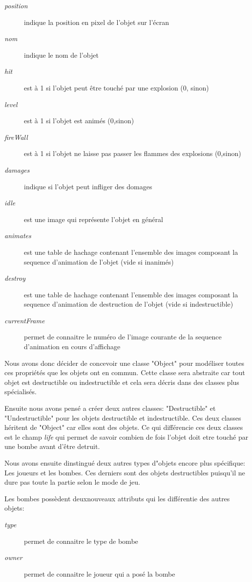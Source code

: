 	\begin{description}
		\item [\textit{position}]{indique la position en pixel de l'objet sur l'écran}
		\item [\textit{nom}]{indique le nom de l'objet}
		\item [\textit{hit}]{est à 1 si l'objet peut être touché par une explosion (0, sinon)}
		\item [\textit{level}]{est à 1 si l'objet est animés (0,sinon)}
		\item [\textit{fireWall}]{est à 1 si l'objet ne laisse pas passer les flammes des explosions (0,sinon)}
		\item [\textit{damages}]{indique si l'objet peut infliger des domages}
		\item [\textit{idle}]{est une image qui représente l'objet en général}
		\item [\textit{animates}]{est une table de hachage contenant l'ensemble des images composant la sequence d'animation de l'objet (vide si inanimés)}
		\item [\textit{destroy}]{est une table de hachage contenant l'ensemble des images composant la sequence d'animation de destruction de l'objet (vide si indestructible)}
		\item [\textit{currentFrame}]{permet de connaitre le numéro de l'image courante de la sequence d'animation en cours d'affichage}
	\end{description}

	Nous avons donc décider de concevoir une classe "Object"  pour modéliser toutes ces propriétés que les objets ont en commun. Cette classe sera abstraite car tout objet est destructible ou indestructible et cela sera décris dans des classes plus spécialisés.
	
	 Ensuite nous avons pensé a créer deux autres classes: "Destructible" et "Undestructible" pour les objets destructible et indestructible. Ces deux classes héritent de "Object" car elles sont des objets. Ce qui différencie ces deux classes est le champ \textit{life} qui permet de savoir combien de fois l'objet doit etre touché par une bombe avant d'être detruit.
	
	Nous avons ensuite dinstingué deux autres types d"objets encore plus spécifique: Les joueurs et les bombes. Ces derniers sont des objets destructibles puisqu'il ne dure pas toute la partie selon le mode de jeu.
	
	Les bombes possèdent deuxnouveaux attributs qui les différentie des autres objets: 
	\begin{description}
		\item [\textit{type}]{permet de connaitre le type de bombe}
		\item [\textit{owner}]{permet de connaitre le joueur qui a posé la bombe}
	\end{description}
	
